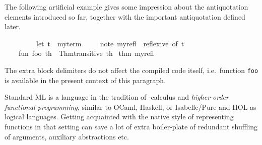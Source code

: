 \begin{isabellebody}
\begin{isamarkuptext}
\begin{description}
  \end{description}%
\end{isamarkuptext}%
\isamarkuptrue%
%
\endisatagmlantiq
{\isafoldmlantiq}%
%
\isadelimmlantiq
%
\endisadelimmlantiq
%
\isadelimmlex
%
\endisadelimmlex
%
\isatagmlex
%
\begin{isamarkuptext}%
The following artificial example gives some impression
  about the antiquotation elements introduced so far, together with
  the important  antiquotation defined later.%
\end{isamarkuptext}%
\isamarkuptrue%
%
\endisatagmlex
{\isafoldmlex}%
%
\isadelimmlex
%
\endisadelimmlex
%
\isadelimML
%
\endisadelimML
%
\isatagML
{}\isamarkupfalse%
\ {}\isanewline
\ \ {}\isanewline
\ \ \ \ %
\isaantiq
let\ {}t\ {}\ my{}term{}%
\endisaantiq
\isanewline
\ \ \ \ %
\isaantiq
note\ my{}refl\ {}\ reflexive\ {}of\ {}t{}{}%
\endisaantiq
\isanewline
\ \ \ \ fun\ foo\ th\ {}\ Thm{}transitive\ th\ %
\isaantiq
thm\ my{}refl{}%
\endisaantiq
\isanewline
\ \ {}\isanewline
{}%
\endisatagML
{\isafoldML}%
%
\isadelimML
%
\endisadelimML
%
\begin{isamarkuptext}%
The extra block delimiters do not affect the compiled code
  itself, i.e.\ function \verb|foo| is available in the present context
  of this paragraph.%
\end{isamarkuptext}%
\isamarkuptrue%
%
\isamarkuptrue%
%
\begin{isamarkuptext}%
Standard ML is a language in the tradition of -calculus and \emph{higher-order functional programming},
  similar to OCaml, Haskell, or Isabelle/Pure and HOL as logical
  languages.  Getting acquainted with the native style of representing
  functions in that setting can save a lot of extra boiler-plate of
  redundant shuffling of arguments, auxiliary abstractions etc.


\end{isamarkuptext}
\end{isabellebody}
